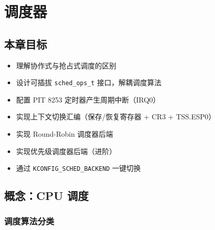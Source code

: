 \chapter{调度器}
\label{ch:scheduler}

\section{本章目标}

\begin{itemize}
  \item 理解协作式与抢占式调度的区别
  \item 设计可插拔 \texttt{sched\_ops\_t} 接口，解耦调度算法
  \item 配置 PIT 8253 定时器产生周期中断（IRQ0）
  \item 实现上下文切换汇编（保存/恢复寄存器 + CR3 + TSS.ESP0）
  \item 实现 Round-Robin 调度器后端
  \item 实现优先级调度器后端（进阶）
  \item 通过 \texttt{KCONFIG\_SCHED\_BACKEND} 一键切换
\end{itemize}

\section{概念：CPU 调度}
\label{sec:sched-concept}


\subsection{调度算法分类}

